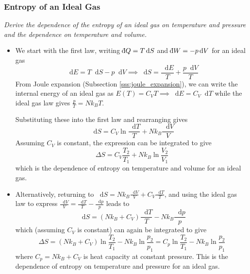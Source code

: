 \documentclass[11pt, a4paper]{article}
\newcommand{\diff}{\mathop{}\!\mathrm{d}} %
\newcommand{\dbar}{{\mathchar '26\mkern -11mu \mathrm{d}}} %
\begin{document}
\subsubsection{Entropy of an Ideal Gas}
\textit{Derive the dependence of the entropy of an ideal gas on temperature and pressure and the dependence on temperature and volume.}
\begin{itemize}
	\item We start with the first law, writing $ \dbar Q = T \diff S $ and $ \dbar W = - p \diff V $ for an ideal gas
	\begin{equation*}
		\diff E = T \diff S - p \diff V \implies \diff S = \frac{\diff E}{T} + \frac{p\diff V}{T}
	\end{equation*}
	From Joule expansion (Subsection \ref{sss:joule_expansion}), we can write the internal energy of an ideal gas as $ E(T) = C_{V}T \implies \diff E = C_{V} \diff T $ while the ideal gas law gives $ \frac{p}{T} = Nk_{B} T $.
	
	Substituting these into the first law and rearranging gives
	\begin{equation*}
		\diff S = C_{V} \ln \frac{\diff T}{T} + Nk_{B}\frac{\diff V}{V}
	\end{equation*}
	Assuming $ C_{V} $ is constant, the expression can be integrated to give
	\begin{equation*}
		\Delta S =  C_{V}\frac{T_{2}}{T_{1}} + Nk_{B} \ln \frac{V_{2}}{V_{1}} 
	\end{equation*}
	which is the dependence of entropy on temperature and volume for an ideal gas.
	
	\item Alternatively, returning to $ \diff S = Nk_{B}\frac{\diff V}{V} + C_{V}\frac{\diff T}{T} $, and using the ideal gas law to express $ \frac{\diff V}{V} = \frac{\diff T}{T} - \frac{\diff p}{p} $ leads to
	\begin{equation*}
		\diff S = (Nk_{B} + C_{V})\frac{\diff T}{T} - Nk_{B}\frac{\diff p}{p}
	\end{equation*}
	which (assuming $ C_{V} $ is constant) can again be integrated to give 
	\begin{equation*}
		\Delta S = (Nk_{B} + C_{V}) \ln \frac{T_{2}}{T_{1}} - Nk_{B}\ln \frac{p_{2}}{p_{1}} = C_{p} \ln \frac{T_{2}}{T_{1}} - Nk_{B}\ln \frac{p_{2}}{p_{1}}
	\end{equation*}
	where $ C_{p} = Nk_{B} + C_{V} $ is heat capacity at constant pressure. This is the dependence of entropy on temperature and pressure for an ideal gas.
\end{itemize}
\end{document}
